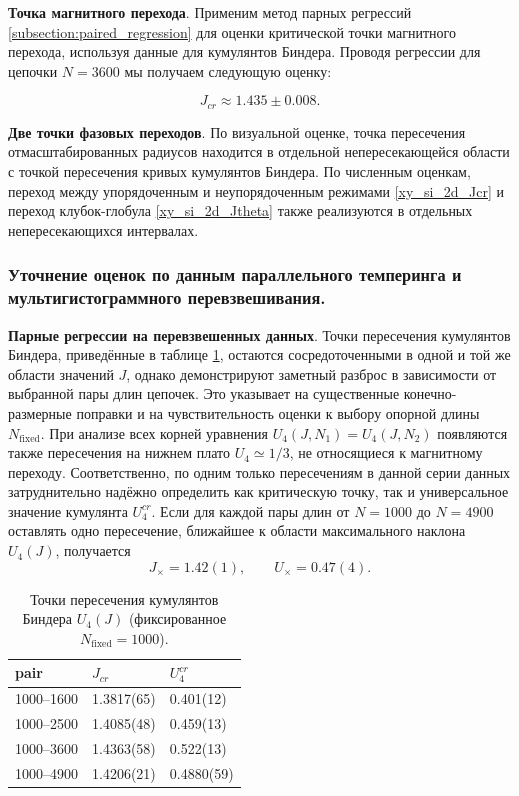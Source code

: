  
 \textbf{Точка магнитного перехода}.   
  Применим метод парных регрессий \ref{subsection:paired_regression} для оценки критической точки магнитного перехода, используя данные для кумулянтов Биндера. Проводя регрессии для цепочки  $N=3600$ мы получаем следующую оценку: 
  
      \begin{equation}
  	\label{xy_si_2d_Jcr}
  	J_{cr} \approx 1.435  \pm 0.008. 
  \end{equation} 
  
  
   \textbf{Две точки фазовых переходов}.    
 По визуальной оценке, точка пересечения отмасштабированных радиусов находится в отдельной непересекающейся области с точкой пересечения кривых кумулянтов Биндера. По численным оценкам, переход между упорядоченным и неупорядоченным режимами \eqref{xy_si_2d_Jcr}  и переход клубок-глобула \eqref{xy_si_2d_Jtheta} также реализуются в отдельных непересекающихся интервалах. 
 
 
 \subsubsection{Уточнение оценок по данным параллельного темперинга и мультигистограммного перевзвешивания.}    
 
 
    \textbf{Парные регрессии на перевзвешенных данных}.  
 Точки пересечения кумулянтов Биндера, приведённые в таблице  \ref{tab:binder_crossings_fixed_XY}, остаются сосредоточенными в одной и той же области значений $J$, однако демонстрируют заметный разброс в зависимости от выбранной пары длин цепочек. 
 Это указывает на существенные конечно-размерные поправки и на чувствительность оценки к выбору опорной длины $N_{\mathrm{fixed}}$. 
 При анализе всех корней уравнения $U_4(J,N_1)=U_4(J,N_2)$ появляются также
 пересечения на нижнем плато $U_4\simeq 1/3$,  не относящиеся к магнитному
 переходу. 
 Соответственно, по одним только пересечениям в данной серии данных затруднительно надёжно определить как критическую точку, так и универсальное значение кумулянта $U_4^{cr}$.  
 Если для каждой пары длин от $N=1000$ до $N=4900$ оставлять одно пересечение, ближайшее к области
 максимального наклона $U_4(J)$, получается
 \[
 J_\times = 1.42(1),
 \qquad
 U_\times = 0.47(4).
 \] 
 
 
 \begin{table}
 	  		\centering 
 	\caption{Точки пересечения кумулянтов Биндера $U_4(J)$ (фиксированное $N_{\mathrm{fixed}}=1000$).}
 	\label{tab:binder_crossings_fixed_XY}
 	\begin{tabular}{lll}
 		\toprule
 	 	pair & $J_{cr}$ & $U^{cr}_4$ \\
 		\midrule
 		1000--1600 & 1.3817(65) & 0.401(12) \\
 		1000--2500 & 1.4085(48) & 0.459(13) \\
 		1000--3600 & 1.4363(58) & 0.522(13) \\
 		1000--4900 & 1.4206(21) & 0.4880(59) \\
 		\bottomrule
 	\end{tabular}
 \end{table}
  
